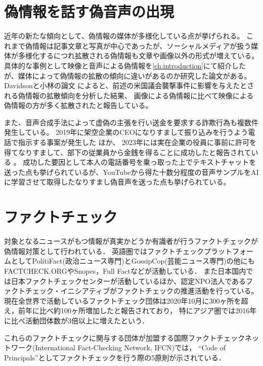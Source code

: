 \section{偽情報を話す偽音声の出現}
近年の新たな傾向として、偽情報の媒体が多様化している点が挙げられる。
これまで偽情報は記事文章と写真が中心であったが、ソーシャルメディアが扱う媒体が多様化するにつれ拡散される偽情報も文章や画像以外の形式が増えている。
具体的な事例として映像と音声による偽情報を\cref{ch:introduction}にて紹介したが、媒体によって偽情報の拡散の傾向に違いがあるのか研究した論文がある。
Davidsonと小林の論文 \cite{DAVIDSON2022107241}によると、前述の米国議会襲撃事件に影響を与えたとされる偽情報の拡散傾向を分析した結果、
画像による偽情報に比べて映像による偽情報の方が多く拡散されたと報告している。

また、音声合成手法によって虚偽の主張を行い送金を要求する詐欺行為も複数件発生している。
2019年に架空企業のCEOになりすまして振り込みを行うよう電話で指示する事案が発生した \cite{Stupp_2019}ほか、
2023年には実在企業の役員に事前に許可を得てなりすまして、部下の従業員から金銭を得ることに成功したと報告されている \cite{Bunn_2023}。
成功した要因として本人の電話番号を乗っ取った上でテキストチャットを送った点も挙げられているが、YouTubeから得た十数分程度の音声サンプルをAIに学習させて取得したなりすまし偽音声を送った点も挙げられている。


\section{ファクトチェック}
対象となるニュースがもつ情報が真実かどうか有識者が行うファクトチェックが偽情報対策として行われている．
英語圏ではファクトチェックプラットフォームとしてPolitiFact(政治ニュース専門)とGossipCop(芸能ニュース専門)の他にもFACTCHECK.ORGやSnopes，Full Factなどが活動している．
また日本国内では日本ファクトチェックセンターが活動しているほか、認定NPO法人であるファクトチェック・イニシアティブがファクトチェックの推進活動を行っている。
現在全世界で活動しているファクトチェック団体は2020年10月に300ヶ所を超え，前年に比べ約100ヶ所増加したと報告されており，
特にアジア圏では2016年に比べ活動団体数が3倍以上に増えたという\cite{stencel_luther_2020}．

これらのファクトチェックに関与する団体が加盟する国際ファクトチェックネットワーク(International Fact-Checking Network, IFCN)では，
``Code of Principals''としてファクトチェックを行う際の5原則が示されている\cite{IFCN,fij}．

